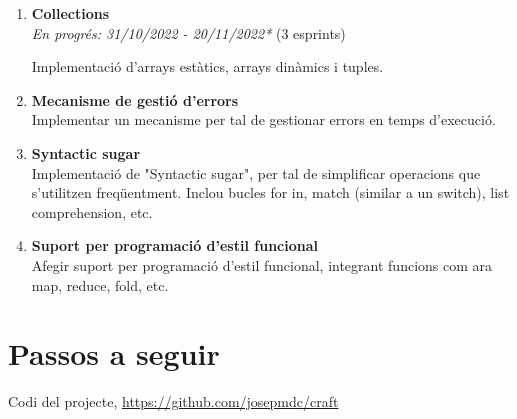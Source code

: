 ﻿\documentclass{article}
\begin{document}
\begin{enumerate}
    \item \textbf{Collections}\\
        \textit{En progrés: 31/10/2022 - 20/11/2022*} (3 esprints)

        Implementació d'arrays estàtics, arrays dinàmics i tuples.

    \item \textbf{Mecanisme de gestió d'errors}\\
        Implementar un mecanisme per tal de gestionar errors en temps d'execució.

    \item \textbf{Syntactic sugar}\\
        Implementació de "Syntactic sugar", per tal de simplificar operacions
        que s'utilitzen freqüentment. Inclou bucles for in, match (similar a un
        switch), list comprehension, etc.

    \item \textbf{Suport per programació d'estil funcional}\\
        Afegir suport per programació d'estil funcional, integrant funcions com
        ara map, reduce, fold, etc.
\end{enumerate}

\section{Passos a seguir}

\begin{thebibliography}{9}

 Codi del projecte, \url{https://github.com/josepmdc/craft}

\end{thebibliography}
\end{document}
